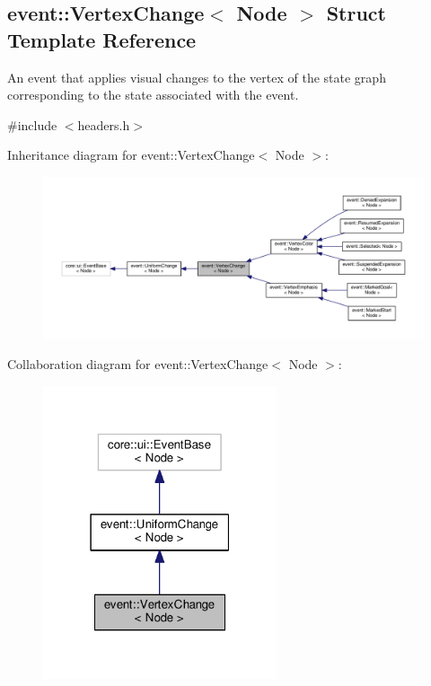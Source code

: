 \hypertarget{structevent_1_1VertexChange}{}\subsection{event\+:\+:Vertex\+Change$<$ Node $>$ Struct Template Reference}
\label{structevent_1_1VertexChange}


An event that applies visual changes to the vertex of the state graph corresponding to the state associated with the event.  




{\ttfamily \#include $<$headers.\+h$>$}



Inheritance diagram for event\+:\+:Vertex\+Change$<$ Node $>$\+:\nopagebreak
\begin{figure}[H]
\begin{center}
\leavevmode
\includegraphics[width=350pt]{structevent_1_1VertexChange__inherit__graph}
\end{center}
\end{figure}


Collaboration diagram for event\+:\+:Vertex\+Change$<$ Node $>$\+:\nopagebreak
\begin{figure}[H]
\begin{center}
\leavevmode
\includegraphics[width=195pt]{structevent_1_1VertexChange__coll__graph}
\end{center}
\end{figure}
